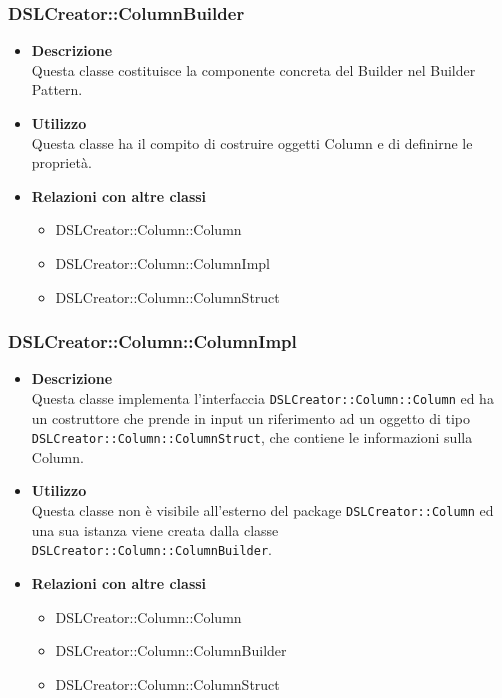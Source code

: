  \subsubsection{DSLCreator::ColumnBuilder}
                    \begin{itemize}
                        \item \textbf{Descrizione} \hfill \\
                          Questa classe costituisce la componente concreta del Builder nel Builder Pattern.
                        \item \textbf{Utilizzo} \hfill \\
                          Questa classe ha il compito di costruire oggetti Column e di definirne le proprietà.
                        \item \textbf{Relazioni con altre classi}
                            \begin{itemize}
                              \item DSLCreator::Column::Column
                              \item DSLCreator::Column::ColumnImpl
                              \item DSLCreator::Column::ColumnStruct
                            \end{itemize}
                    \end{itemize}  

 \subsubsection{DSLCreator::Column::ColumnImpl}
                    \begin{itemize}
                        \item \textbf{Descrizione} \hfill \\
                          Questa classe implementa l'interfaccia \texttt{DSLCreator::Column::Column} ed ha un costruttore che prende in input un riferimento ad un oggetto di tipo \texttt{DSLCreator::Co\-lumn::ColumnStruct}, che contiene le informazioni sulla Column.
                        \item \textbf{Utilizzo} \hfill \\
                          Questa classe non è visibile all'esterno del package \texttt{DSLCreator::Column} ed una sua istanza viene creata dalla classe \texttt{DSLCreator::Column::ColumnBuilder}.
                        \item \textbf{Relazioni con altre classi}
                            \begin{itemize}
                              \item DSLCreator::Column::Column
                              \item DSLCreator::Column::ColumnBuilder
                              \item DSLCreator::Column::ColumnStruct
                            \end{itemize}
                    \end{itemize}  

